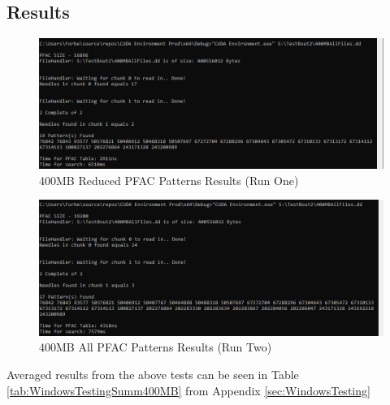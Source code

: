 \subsection{Results}
\label{sec:400MBAppendixResults}
\begin{figure}[!ht]
    \centering
    \includegraphics[width=\linewidth]{Images/Tests/400MB/runOne.png}
    \caption{400\ac{MB} Reduced \ac{PFAC} Patterns Results (Run One)}
    \label{fig:runOneResults}
\end{figure}
\begin{figure}[!ht]
    \centering
    \includegraphics[width=\linewidth]{Images/Tests/400MB/runTwo.png}
    \caption{400\ac{MB} All \ac{PFAC} Patterns Results (Run Two)}
    \label{fig:runTwoResults}
\end{figure}

Averaged results from the above tests can be seen in Table \ref{tab:WindowsTestingSumm400MB} from Appendix \ref{sec:WindowsTesting}
